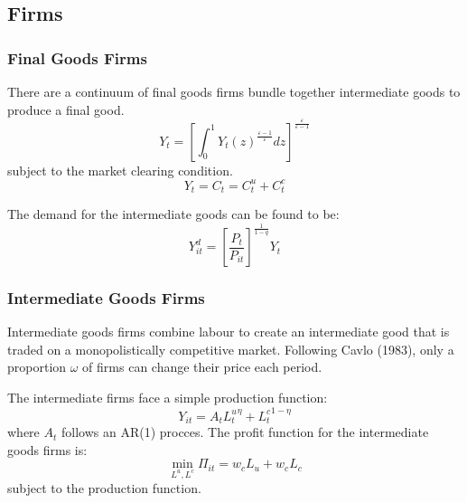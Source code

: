 \documentclass[11pt, a4paper]{article}
\begin{document}
\subsection{Firms}


\subsubsection{Final Goods Firms}

There are a continuum of final goods firms bundle together intermediate goods to produce a final good. 
\begin{equation}
Y_{t}=\left[\int_{0}^{1} Y_{t}(z)^{\frac{\varepsilon-1}{\varepsilon}} d z\right]^{\frac{\varepsilon}{\varepsilon-1}}
\end{equation}
subject to the market clearing condition.
\begin{equation}
Y_{t}=C_{t}=C_{t}^{u}+C_{t}^{c}
\end{equation}


The demand for the intermediate goods can be found to be:
\begin{equation}
  Y_{it}^d =\left[\frac{P_t}{P_{it}}\right]^\frac{1}{1-q} Y_t
\end{equation}




\subsubsection{Intermediate Goods Firms}

Intermediate goods firms combine labour to create an intermediate good that is traded on a monopolistically competitive market. Following Cavlo (1983), only a proportion $\omega$ of firms can change their price each period.

The intermediate firms face a simple production function:
\begin{equation}
  Y_{it} = A_t {L_t^u}^ \eta + {L^c_t}^{1-\eta}
\end{equation}
where $A_t$ follows an AR(1) procces. The profit function for the intermediate goods firms is:
\begin{equation}
  \min_{L^u, L^c} \Pi_{it} = w_c L_u + w_c L_c
\end{equation}
subject to the production function. 
\end{document}
